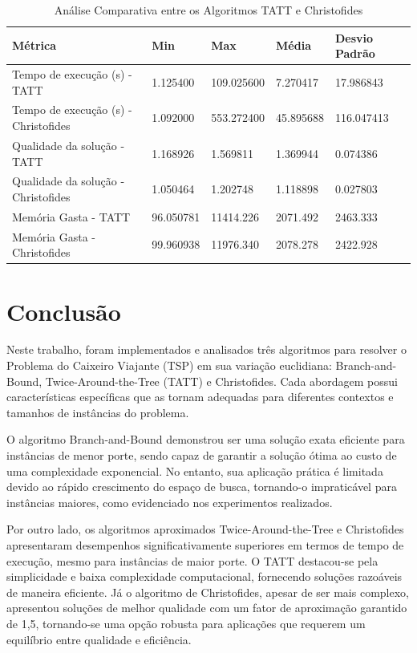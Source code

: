 \documentclass[12pt]{article}
\begin{document}
\begin{table}[ht]
\caption{Análise Comparativa entre os Algoritmos TATT e Christofides}
\label{tab:comparative_analysis}
\small %
\begin{tabularx}{\textwidth}{lXXXX}
\toprule
Métrica & Min & Max & Média & Desvio Padrão \\
\midrule
Tempo de execução (s) - TATT & 1.125400 & 109.025600 & 7.270417 & 17.986843 \\
Tempo de execução (s) - Christofides & 1.092000 & 553.272400 & 45.895688 & 116.047413 \\
Qualidade da solução - TATT & 1.168926 & 1.569811 & 1.369944 & 0.074386 \\
Qualidade da solução - Christofides & 1.050464 & 1.202748 & 1.118898 & 0.027803 \\
Memória Gasta - TATT & 96.050781 & 11414.226 & 2071.492 & 2463.333 \\
Memória Gasta - Christofides & 99.960938 & 11976.340 & 2078.278 & 2422.928 \\
\bottomrule
\end{tabularx}
\end{table}

\section{Conclusão}

Neste trabalho, foram implementados e analisados três algoritmos para resolver o Problema do Caixeiro Viajante (TSP) em sua variação euclidiana: Branch-and-Bound, Twice-Around-the-Tree (TATT) e Christofides. Cada abordagem possui características específicas que as tornam adequadas para diferentes contextos e tamanhos de instâncias do problema.

O algoritmo Branch-and-Bound demonstrou ser uma solução exata eficiente para instâncias de menor porte, sendo capaz de garantir a solução ótima ao custo de uma complexidade exponencial. No entanto, sua aplicação prática é limitada devido ao rápido crescimento do espaço de busca, tornando-o impraticável para instâncias maiores, como evidenciado nos experimentos realizados.

Por outro lado, os algoritmos aproximados Twice-Around-the-Tree e Christofides apresentaram desempenhos significativamente superiores em termos de tempo de execução, mesmo para instâncias de maior porte. O TATT destacou-se pela simplicidade e baixa complexidade computacional, fornecendo soluções razoáveis de maneira eficiente. Já o algoritmo de Christofides, apesar de ser mais complexo, apresentou soluções de melhor qualidade com um fator de aproximação garantido de 1,5, tornando-se uma opção robusta para aplicações que requerem um equilíbrio entre qualidade e eficiência.
\end{document}

